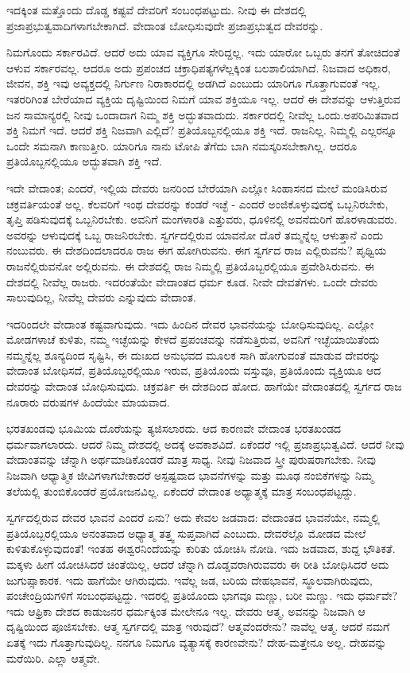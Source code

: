 ಇದಕ್ಕಿಂತ ಮತ್ತೊಂದು ದೊಡ್ಡ ಕಷ್ಟವೆ ದೇವರಿಗೆ ಸಂಬಂಧಪಟ್ಟುದು. ನೀವು ಈ ದೇಶದಲ್ಲಿ ಪ್ರಜಾಪ್ರಭುತ್ವವಾದಿಗಳಾಗಬೇಕಾಗಿದೆ. ವೇದಾಂತ ಬೋಧಿಸುವುದೇ ಪ್ರಜಾಪ್ರಭುತ್ವದ ದೇವರನ್ನು.

ನಿಮಗೊಂದು ಸರ್ಕಾರವಿದೆ. ಆದರೆ ಅದು ಯಾವ ವ್ಯಕ್ತಿಗೂ ಸೇರಿದ್ದಲ್ಲ. ಇದು ಯಾರೋ ಒಬ್ಬರು ತನಗೆ ತೋಚಿದಂತೆ ಆಳುವ ಸರ್ಕಾರವಲ್ಲ. ಆದರೂ ಅದು ಪ್ರಪಂಚದ ಚಕ್ರಾಧಿಪತ್ಯಗಳೆಲ್ಲಕ್ಕಿಂತ ಬಲಶಾಲಿಯಾಗಿದೆ. ನಿಜವಾದ ಅಧಿಕಾರ, ಜೀವನ, ಶಕ್ತಿ ಇವು ಅವ್ಯಕ್ತದಲ್ಲಿ ನಿರ್ಗುಣ ನಿರಾಕಾರದಲ್ಲಿ ಅಡಗಿದೆ ಎಂಬುದು ಯಾರಿಗೂ ಗೊತ್ತಾಗುವಂತೆ ಇಲ್ಲ. ಇತರರಿಗಿಂತ ಬೇರೆಯಾದ ವ್ಯಕ್ತಿಯ ದೃಷ್ಟಿಯಿಂದ ನಿಮಗೆ ಯಾವ ಶಕ್ತಿಯೂ ಇಲ್ಲ. ಆದರೆ ಈ ದೇಶವನ್ನು ಆಳುತ್ತಿರುವ ಜನ ಸಾಮಾನ್ಯರಲ್ಲಿ ನೀವು ಒಂದಾದಾಗ ನಿಮ್ಮ ಶಕ್ತಿ ಅದ್ಭುತವಾದುದು. ಸರ್ಕಾರದಲ್ಲಿ ನೀವೆಲ್ಲ ಒಂದು.\break ಅಪರಿಮಿತವಾದ ಶಕ್ತಿ ನಿಮಗೆ ಇದೆ. ಆದರೆ ಶಕ್ತಿ ನಿಜವಾಗಿ ಎಲ್ಲಿದೆ? ಪ್ರತಿಯೊಬ್ಬನಲ್ಲಿಯೂ ಶಕ್ತಿ ಇದೆ. ರಾಜನಿಲ್ಲ. ನಿಮ್ಮಲ್ಲಿ ಎಲ್ಲರನ್ನೂ ಒಂದೇ ಸಮನಾಗಿ ಕಾಣುತ್ತೀರಿ. ಯಾರಿಗೂ ನಾನು ಟೋಪಿ ತೆಗೆದು ಬಾಗಿ ನಮಸ್ಕರಿಸಬೇಕಾಗಿಲ್ಲ. ಆದರೂ ಪ್ರತಿಯೊಬ್ಬನಲ್ಲಿಯೂ ಅದ್ಭುತವಾಗಿ ಶಕ್ತಿ ಇದೆ.

ಇದೇ ವೇದಾಂತ; ಎಂದರೆ, ಇಲ್ಲಿಯ ದೇವರು ಜನರಿಂದ ಬೇರೆಯಾಗಿ ಎಲ್ಲೋ ಸಿಂಹಾಸನದ ಮೇಲೆ ಮಂಡಿಸಿರುವ ಚಕ್ರವರ್ತಿಯಂತೆ ಅಲ್ಲ. ಕೆಲವರಿಗೆ ಇಂಥ ದೇವರನ್ನು ಕಂಡರೆ ಇಚ್ಛೆ - ಎಂದರೆ ಅಂಜಿಕೊಳ್ಳುವುದಕ್ಕೆ ಒಬ್ಬನಿರಬೇಕು, ತೃಪ್ತಿ ಪಡಿಸುವುದಕ್ಕೆ ಒಬ್ಬನಿರಬೇಕು. ಅವನಿಗೆ ಮಂಗಳಾರತಿ ಎತ್ತುವರು, ಧೂಳಿನಲ್ಲಿ ಅವನೆದುರಿಗೆ ಹೊರಳಾಡುವರು. ಅವರನ್ನು ಆಳುವುದಕ್ಕೆ ಒಬ್ಬ ರಾಜನಿರಬೇಕು. ಸ್ವರ್ಗದಲ್ಲಿರುವ ಯಾವನೋ ದೊರೆ ತಮ್ಮನ್ನೆಲ್ಲ ಆಳುತ್ತಾನೆ ಎಂದು ನಂಬುವರು. ಈ ದೇಶದಿಂದಲಾದರೂ ರಾಜ ಈಗ ಹೋಗಿರುವನು. ಈಗ ಸ್ವರ್ಗದ ರಾಜ ಎಲ್ಲಿರುವನು? ಪೃಥ್ವಿಯ ರಾಜನೆಲ್ಲಿರುವನೋ ಅಲ್ಲಿರುವನು. ಈ ದೇಶದಲ್ಲಿ ರಾಜ ನಿಮ್ಮಲ್ಲಿ ಪ್ರತಿಯೊಬ್ಬರಲ್ಲಿಯೂ ಪ್ರವೇಶಿಸಿರುವನು. ಈ ದೇಶದಲ್ಲಿ ನೀವೆಲ್ಲ ರಾಜರು. ಇದರಂತೆಯೇ ವೇದಾಂತದ ಧರ್ಮ ಕೂಡ. ನೀವೇ ದೇವತೆಗಳು. ಒಂದೇ ದೇವರು ಸಾಲುವುದಿಲ್ಲ, ನೀವೆಲ್ಲ ದೇವರು ಎನ್ನುವುದು ವೇದಾಂತ.

ಇದರಿಂದಲೇ ವೇದಾಂತ ಕಷ್ಟವಾಗುವುದು. ಇದು ಹಿಂದಿನ ದೇವರ ಭಾವನೆಯನ್ನು ಬೋಧಿಸುವುದಿಲ್ಲ. ಎಲ್ಲೋ ಮೋಡಗಳಾಚೆ ಕುಳಿತು, ನಮ್ಮ ಇಚ್ಛೆಯನ್ನು ಕೇಳದೆ ಪ್ರಪಂಚವನ್ನು ನಡೆಸುತ್ತಿರುವ, ಅವನಿಗೆ ಇಚ್ಛೆಯಾಯಿತೆಂದು ನಮ್ಮನ್ನೆಲ್ಲ ಶೂನ್ಯದಿಂದ ಸೃಷ್ಟಿಸಿ, ಈ ದುಃಖದ ಅನುಭವದ ಮೂಲಕ ಸಾಗಿ ಹೋಗುವಂತೆ ಮಾಡುವ ದೇವರನ್ನು ವೇದಾಂತ ಬೋಧಿಸದೆ, ಪ್ರತಿಯೊಬ್ಬರಲ್ಲಿಯೂ ಇರುವ, ಪ್ರತಿಯೊಂದು ವಸ್ತುವೂ, ಪ್ರತಿಯೊಂದು ವ್ಯಕ್ತಿಯೂ ಆದ ದೇವರನ್ನು ವೇದಾಂತ ಬೋಧಿಸುವುದು. ಚಕ್ರವರ್ತಿ ಈ ದೇಶದಿಂದ ಹೋದ. ಹಾಗೆಯೇ ವೇದಾಂತದಲ್ಲಿ ಸ್ವರ್ಗದ ರಾಜ ನೂರಾರು ವರುಷಗಳ ಹಿಂದೆಯೇ ಮಾಯವಾದ.

ಭರತಖಂಡವು ಭೂಮಿಯ ದೊರೆಯನ್ನು ತ್ಯಜಿಸಲಾರದು. ಆದ ಕಾರಣವೇ ವೇದಾಂತ ಭರತಖಂಡದ ಧರ್ಮವಾಗಲಾರದು. ಆದರೆ ನಿಮ್ಮ ದೇಶದಲ್ಲಿ ಅದಕ್ಕೆ ಅವಕಾಶವಿದೆ. ಏಕೆಂದರೆ ಇಲ್ಲಿ ಪ್ರಜಾಪ್ರಭುತ್ವವಿದೆ. ಆದರೆ ನೀವು ವೇದಾಂತವನ್ನು ಚೆನ್ನಾಗಿ ಅರ್ಥಮಾಡಿಕೊಂಡರೆ ಮಾತ್ರ ಸಾಧ್ಯ. ನೀವು ನಿಜವಾದ ಸ್ತ್ರೀ ಪುರುಷರಾಗಬೇಕು. ನೀವು ನಿಜವಾಗಿ ಆಧ್ಯಾತ್ಮಿಕ ಜೀವಿಗಳಾಗಬೇಕಾದರೆ ಅಸ್ಪಷ್ಟವಾದ ಭಾವನೆಗಳನ್ನು ಮತ್ತು ಮೂಢ ನಂಬಿಕೆಗಳನ್ನು ನಿಮ್ಮ ತಲೆಯಲ್ಲಿ ತುಂಬಿಕೊಂಡರೆ ಪ್ರಯೋಜನವಿಲ್ಲ. ಏಕೆಂದರೆ ವೇದಾಂತ ಅಧ್ಯಾತ್ಮಕ್ಕೆ ಮಾತ್ರ ಸಂಬಂಧಪಟ್ಟದ್ದು.

ಸ್ವರ್ಗದಲ್ಲಿರುವ ದೇವರ ಭಾವನೆ ಎಂದರೆ ಏನು? ಅದು ಕೇವಲ ಜಡವಾದ: ವೇದಾಂತದ ಭಾವನೆಯೇ, ನಮ್ಮಲ್ಲಿ ಪ್ರತಿಯೊಬ್ಬರಲ್ಲಿಯೂ ಅನಂತವಾದ ಅಧ್ಯಾತ್ಮ ತತ್ತ್ವ ಸುಪ್ತವಾಗಿದೆ ಎಂಬುದು. ದೇವರೆಲ್ಲೊ ಮೋಡದ ಮೇಲೆ ಕುಳಿತುಕೊಳ್ಳುವುದಂತೆ! ಇಂತಹ ಈಶ್ವರನಿಂದೆಯನ್ನು ಕುರಿತು ಯೋಚಿಸಿ ನೋಡಿ. ಇದು ಜಡವಾದ, ಶುದ್ದ ಭೌತಿಕತೆ. ಮಕ್ಕಳು ಹೀಗೆ ಯೋಚಿಸಿದರೆ ಚಿಂತೆಯಿಲ್ಲ, ಆದರೆ ಚೆನ್ನಾಗಿ ದೊಡ್ಡವರಾಗಿರುವವರು ಈ ರೀತಿ ಬೋಧಿಸಿದರೆ ಅದು ಜುಗುಪ್ಸಾಕಾರಕ. ಇದು ಹಾಗೆಯೇ ಆಗಿರುವುದು. ಇವೆಲ್ಲ ಜಡ, ಬರಿಯ ದೇಹಭಾವನೆ, ಸ್ಥೂಲವಾಗಿರುವುದು, ಪಂಚೇಂದ್ರಿಯಗಳಿಗೆ ಸಂಬಂಧಪಟ್ಟದ್ದು. ಇದರಲ್ಲಿ ಪ್ರತಿಯೊಂದು ಭಾಗವೂ ಮಣ್ಣು, ಬರೀ ಮಣ್ಣು. ಇದು ಧರ್ಮವೇ? ಇದು ಆಫ್ರಿಕಾ ದೇಶದ ಕಾಡುಜನರ ಧರ್ಮಕ್ಕಿಂತ ಮೇಲೇನೂ ಇಲ್ಲ. ದೇವರು ಆತ್ಮ, ಅವನನ್ನು ನಿಜವಾಗಿ ಆ ದೃಷ್ಟಿಯಿಂದ ಪೂಜಿಸಬೇಕು. ಆತ್ಮ ಸ್ವರ್ಗದಲ್ಲಿ ಮಾತ್ರ ಇರುವುದೆ? ಆತ್ಮವೆಂದರೇನು? ನಾವೆಲ್ಲ ಆತ್ಮ. ಆದರೆ ನಮಗೆ ಏತಕ್ಕೆ ಇದು ಗೊತ್ತಾಗುವುದಿಲ್ಲ. ನನಗೂ ನಿಮಗೂ ವ್ಯತ್ಯಾಸಕ್ಕೆ ಕಾರಣವೇನು? ದೇಹ-ಮತ್ತೇನೂ ಅಲ್ಲ. ದೇಹವನ್ನು ಮರೆಯಿರಿ. ಎಲ್ಲಾ ಆತ್ಮವೇ.


